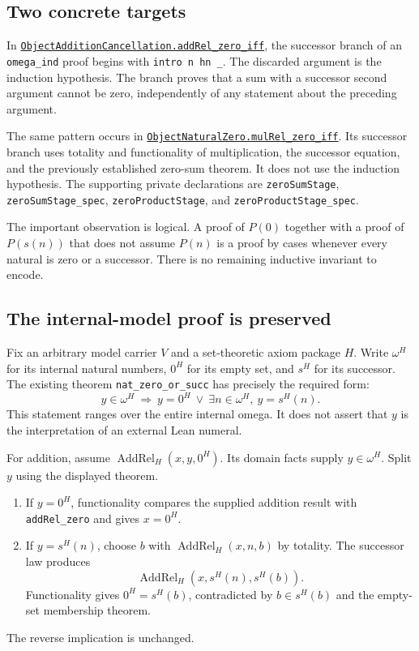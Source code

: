 \documentclass[11pt,letterpaper]{article}
\newcommand{\code}[1]{\nolinkurl{#1}}
\newcommand{\src}[2]{\href{https://github.com/VladimirReshetnikov/ProveIt/blob/9bd29079d5e1c6cc1c0bcaee6cb57d59b835cba9/Computability/DiophantineConsistency/Lean/DiophantineConsistency/#1.lean}{\code{#1.#2}}}
\begin{document}
\subsection{Two concrete targets}

In \src{ObjectAdditionCancellation}{addRel_zero_iff}, the successor branch of an \code{omega_ind} proof begins with \code{intro n hn _}. The discarded argument is the induction hypothesis. The branch proves that a sum with a successor second argument cannot be zero, independently of any statement about the preceding argument.

The same pattern occurs in \src{ObjectNaturalZero}{mulRel_zero_iff}. Its successor branch uses totality and functionality of multiplication, the successor equation, and the previously established zero-sum theorem. It does not use the induction hypothesis. The supporting private declarations are \code{zeroSumStage}, \code{zeroSumStage_spec}, \code{zeroProductStage}, and \code{zeroProductStage_spec}.

The important observation is logical. A proof of $P(0)$ together with a proof of $P(s(n))$ that does not assume $P(n)$ is a proof by cases whenever every natural is zero or a successor. There is no remaining inductive invariant to encode.

\subsection{The internal-model proof is preserved}

Fix an arbitrary model carrier $V$ and a set-theoretic axiom package $H$. Write $\omega^H$ for its internal natural numbers, $0^H$ for its empty set, and $s^H$ for its successor. The existing theorem \code{nat_zero_or_succ} has precisely the required form:
\[
 y\in\omega^H\ \Longrightarrow\
 y=0^H\ \lor\ \exists n\in\omega^H,\ y=s^H(n).
\]
This statement ranges over the entire internal omega. It does not assert that $y$ is the interpretation of an external Lean numeral.

For addition, assume $\operatorname{AddRel}_H(x,y,0^H)$. Its domain facts supply $y\in\omega^H$. Split $y$ using the displayed theorem.
\begin{enumerate}
\item If $y=0^H$, functionality compares the supplied addition result with \code{addRel_zero} and gives $x=0^H$.
\item If $y=s^H(n)$, choose $b$ with $\operatorname{AddRel}_H(x,n,b)$ by totality. The successor law produces
\[\operatorname{AddRel}_H(x,s^H(n),s^H(b)).\]
Functionality gives $0^H=s^H(b)$, contradicted by $b\in s^H(b)$ and the empty-set membership theorem.
\end{enumerate}
The reverse implication is unchanged.
\end{document}
